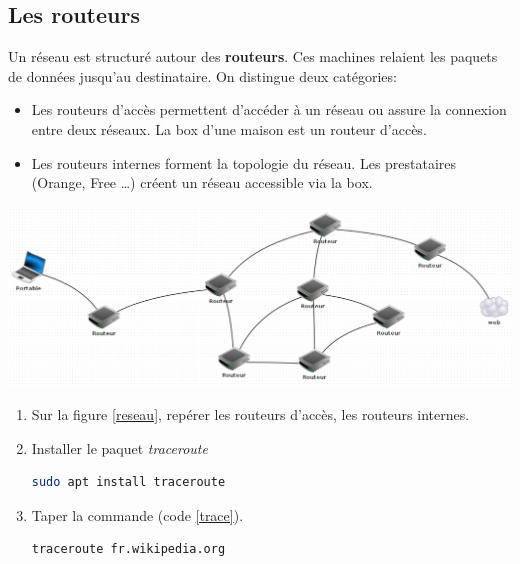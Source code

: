 \documentclass[a4paper,11pt]{article}
\begin{document}
\subsection{Les routeurs}
Un réseau est structuré autour des \textbf{routeurs}. Ces machines relaient les paquets de données jusqu'au destinataire. On distingue deux catégories:
\begin{itemize}
    \item Les routeurs d'accès permettent d'accéder à un réseau ou assure la connexion entre deux réseaux. La box d'une maison est un routeur d'accès.
    \item Les routeurs internes forment la topologie du réseau. Les prestataires (Orange, Free \dots) créent un réseau accessible via la box. 
\end{itemize}
\begin{center}
    \centering
    \includegraphics[width=15cm]{ressources/reseau.png}
    \label{reseau}
\end{center}
\begin{activite}
\begin{enumerate}
    \item Sur la figure \ref{reseau}, repérer les routeurs d'accès, les routeurs internes.
    \item Installer le paquet \emph{traceroute}
    \begin{center}
        \begin{lstlisting}[language=bash]
sudo apt install traceroute
        \end{lstlisting}
        \label{ip}
    \end{center}
    \item Taper la commande (code \ref{trace}).
    \begin{center}
        \begin{lstlisting}[language=bash]
traceroute fr.wikipedia.org
        \end{lstlisting}
        \label{trace}
    \end{center}
\end{enumerate}
\end{activite}
\end{document}
